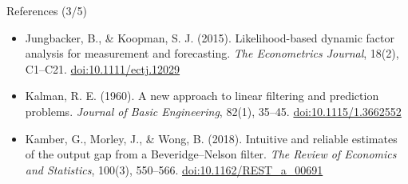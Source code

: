 \begin{frame}{References (3/5)}
\begin{itemize}
    \item Jungbacker, B., \& Koopman, S. J. (2015). Likelihood-based dynamic factor analysis for measurement and forecasting. \textit{The Econometrics Journal}, 18(2), C1--C21. \href{https://doi.org/10.1111/ectj.12029}{doi:10.1111/ectj.12029}
    \item Kalman, R. E. (1960). A new approach to linear filtering and prediction problems. \textit{Journal of Basic Engineering}, 82(1), 35--45. \href{https://doi.org/10.1115/1.3662552}{doi:10.1115/1.3662552}
    \item Kamber, G., Morley, J., \& Wong, B. (2018). Intuitive and reliable estimates of the output gap from a Beveridge--Nelson filter. \textit{The Review of Economics and Statistics}, 100(3), 550--566. \href{https://doi.org/10.1162/REST_a_00691}{doi:10.1162/REST\_a\_00691}
\end{itemize}
\end{frame}

